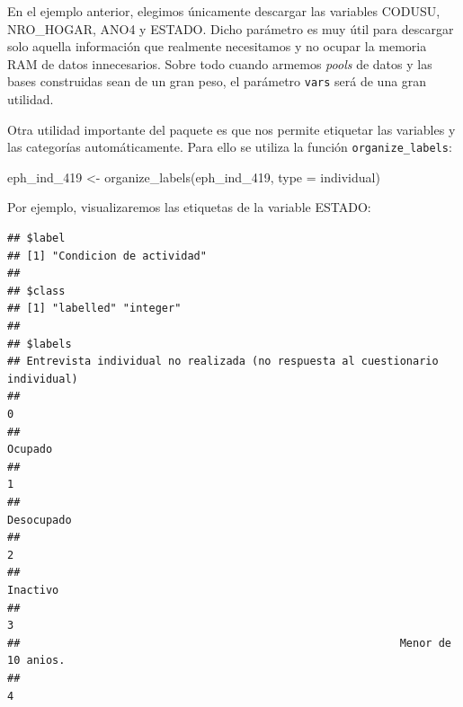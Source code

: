 \documentclass[
]{book}
\newenvironment{Shaded}{\begin{snugshade}}{\end{snugshade}}
\newcommand{\AttributeTok}[1]{\textcolor[rgb]{0.77,0.63,0.00}{#1}}
\newcommand{\FunctionTok}[1]{\textcolor[rgb]{0.00,0.00,0.00}{#1}}
\newcommand{\NormalTok}[1]{#1}
\newcommand{\OtherTok}[1]{\textcolor[rgb]{0.56,0.35,0.01}{#1}}
\newcommand{\SpecialCharTok}[1]{\textcolor[rgb]{0.00,0.00,0.00}{#1}}
\newcommand{\StringTok}[1]{\textcolor[rgb]{0.31,0.60,0.02}{#1}}
\begin{document}
En el ejemplo anterior, elegimos únicamente descargar las variables CODUSU, NRO\_HOGAR, ANO4 y ESTADO. Dicho parámetro es muy útil para descargar solo aquella información que realmente necesitamos y no ocupar la memoria RAM de datos innecesarios. Sobre todo cuando armemos \emph{pools} de datos y las bases construidas sean de un gran peso, el parámetro \texttt{vars} será de una gran utilidad.

Otra utilidad importante del paquete es que nos permite etiquetar las variables y las categorías automáticamente. Para ello se utiliza la función \texttt{organize\_labels}:

\begin{Shaded}
\begin{Highlighting}[]
\NormalTok{eph\_ind\_419 }\OtherTok{\textless{}{-}} \FunctionTok{organize\_labels}\NormalTok{(eph\_ind\_419, }\AttributeTok{type =} \StringTok{\textquotesingle{}individual\textquotesingle{}}\NormalTok{)}
\end{Highlighting}
\end{Shaded}

Por ejemplo, visualizaremos las etiquetas de la variable ESTADO:

\begin{Shaded}
\end{Shaded}

\begin{verbatim}
## $label
## [1] "Condicion de actividad"
## 
## $class
## [1] "labelled" "integer" 
## 
## $labels
## Entrevista individual no realizada (no respuesta al cuestionario individual) 
##                                                                            0 
##                                                                      Ocupado 
##                                                                            1 
##                                                                   Desocupado 
##                                                                            2 
##                                                                     Inactivo 
##                                                                            3 
##                                                           Menor de 10 anios. 
##                                                                            4
\end{verbatim}
\end{document}
